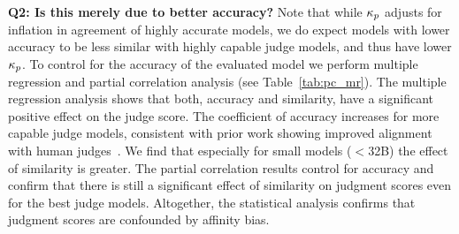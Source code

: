 \textbf{Q2: Is this merely due to better accuracy?} Note that while $\kappa_{p}$ adjusts for inflation in agreement of highly accurate models, we do expect models with lower accuracy to be less similar with highly capable judge models, and thus have lower $\kappa_{p}$. To control for the accuracy of the evaluated model we perform multiple regression and partial correlation analysis (see Table~\ref{tab:pc_mr}). The multiple regression analysis shows that both, accuracy and similarity, have a significant positive effect on the judge score. The coefficient of accuracy increases for more capable judge models, consistent with prior work showing improved alignment with human judges~\citep{thakur2024judgingjudgesevaluatingalignment}. We find that especially for small models ($<$32B) the effect of similarity is greater. The partial correlation results control for accuracy and confirm that there is still a significant effect of similarity on judgment scores even for the best judge models. Altogether, the statistical analysis confirms that judgment scores are confounded by affinity bias. 